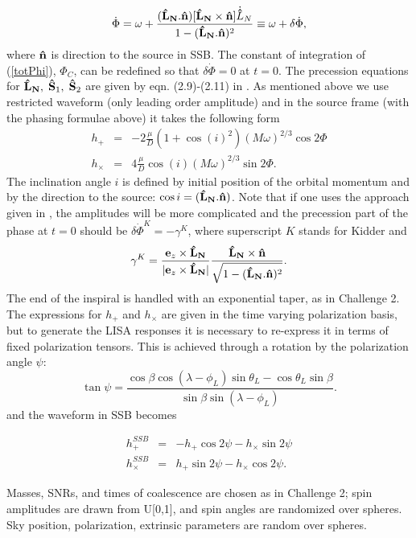 \documentclass{iopart}
\def\bL{{\bf \hat{L}_{N}}}
\def\hn{{\bf {\hat n}}}
\begin{document}
\begin{equation}
\dot{\Phi} = \omega + \frac{(\bL.\hn)[\bL\times \hn]\dot{\bf \hat{L}}_N}{1-(\bL.\hn)^2}
\equiv \omega + \delta\dot{\Phi},\label{totPhi}
\end{equation}
where $\hn$ is direction to the source in SSB. The constant of integration of (\ref{totPhi}),
 $\Phi_C$,  can be redefined so that $\delta\dot{\Phi} = 0$ at $t=0$.  The precession  
 equations for $\bL, \; {\bf \hat{S}}_1,\;{\bf \hat{S}}_2$ are given by eqn. (2.9)-(2.11) in 
 \cite{LangHughes}. As mentioned above we use restricted waveform (only leading order amplitude) and in the source frame (with the phasing formulae above) it takes the following form 
 \begin{eqnarray}
h_{+} &=& -2\frac{\mu}{D}(1 + \cos(i)^2)(M\omega)^{2/3}\cos{2\Phi}\\
h_{\times} &=& 4\frac{\mu}{D}\cos(i)(M\omega)^{2/3}\sin{2\Phi}.
\end{eqnarray}
The inclination angle $i$ is defined by initial position of the orbital momentum and 
by the direction to the source: $\cos{i} = (\bL.\hn)$.
Note that if one uses the approach given in \cite{Kidder}, the amplitudes will be more complicated
and the precession part of the phase at $t=0$ should be $\delta\dot{\Phi}^K = -\gamma^K$,
where superscript $K$ stands for Kidder and 
$$
\gamma^K = \frac{{\bf e}_z \times \bL}{|{\bf e}_z \times \bL|}\frac{\bL\times \hn}
{\sqrt{1 - (\bL.\hn)^2}}.
$$
The end of the inspiral is handled with an exponential taper, as in Challenge 2. The expressions 
for $h_{+}$ and $h_{\times}$ are given in the time varying polarization basis, but to generate the LISA responses it is necessary to re-express it in terms
of fixed polarization tensors. This is achieved through a rotation by the polarization
angle $\psi$:
\begin{equation}
\tan{\psi} = \frac{\cos{\beta}\cos{(\lambda -\phi_L)}\sin{\theta_L} - \cos{\theta_L}\sin{\beta}}
{\sin{\beta}\sin{(\lambda - \phi_L)}}.
\end{equation}
and the waveform in SSB becomes

\begin{eqnarray}
h_{+}^{SSB} &=& -h_{+}\cos{2\psi} - h_{\times}\sin{2\psi}\\
h_{\times}^{SSB} &=& h_{+}\sin{2\psi} - h_{\times}\cos{2\psi}.
\end{eqnarray}





Masses, SNRs, and times of coalescence
are chosen as in Challenge 2; spin amplitudes are drawn from U[0,1], and spin angles are randomized over spheres.
Sky position, polarization, extrinsic parameters are random over spheres.
\end{document}
